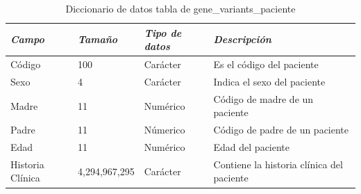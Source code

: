 \begin{table}[h!]
	\begin{tabular}{|l|l|l|p{6cm}|}
		\hline
		\textit{\textbf{Campo}} & \textit{\textbf{Tamaño}} & \textit{\textbf{Tipo de datos}} & \textit{\textbf{Descripción}}             \\ \hline
		Código                  & 100                      & Carácter                       & Es el código del paciente                 \\ \hline
		Sexo                    & 4                        & Carácter                       & Indica el sexo del paciente               \\ \hline
		Madre                   & 11                       & Numérico                       & Código de madre de un paciente            \\ \hline
		Padre                   & 11                       & Númerico                       & Código de padre de un paciente            \\ \hline
		Edad                    & 11                       & Numérico                       & Edad del paciente                         \\ \hline
		Historia Clínica        & 4,294,967,295            & Carácter                       & Contiene la historia clínica del paciente \\ \hline
	\end{tabular}
\caption{Diccionario de datos tabla de gene\_variants\_paciente}
\label{tabla:datos}
\end{table}



